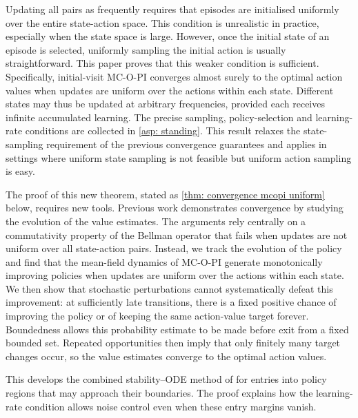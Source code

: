 Updating all pairs as frequently requires that episodes are initialised uniformly over the entire state-action space.
This condition is unrealistic in practice, especially when the state space is large.
However, once the initial state of an episode is selected, uniformly sampling the initial action is usually straightforward.
This paper proves that this weaker condition is sufficient.
Specifically, initial-visit MC-O-PI converges almost surely to the optimal action values when updates are uniform over the actions within each state.
Different states may thus be updated at arbitrary frequencies, provided each receives infinite accumulated learning. The precise sampling, policy-selection and learning-rate conditions are collected in \autoref{asp: standing}.
This result relaxes the state-sampling requirement of the previous convergence guarantees 
and applies in settings where uniform state sampling is not feasible but uniform action sampling is easy.






















The proof of this new theorem, stated as \autoref{thm: convergence mcopi uniform} below, requires new tools. 
Previous work demonstrates convergence by studying the evolution of the value estimates. The arguments rely centrally on a commutativity property of the Bellman operator that fails when updates are not uniform over all state-action pairs.
Instead, we track the evolution of the policy and find that the mean-field dynamics of MC-O-PI generate monotonically improving policies when updates are uniform over the actions within each state.
We then show that stochastic perturbations cannot systematically defeat this improvement: at sufficiently late transitions, there is a fixed positive chance of improving the policy or of keeping the same action-value target forever. Boundedness allows this probability estimate to be made before exit from a fixed bounded set. Repeated opportunities then imply that only finitely many target changes occur, so the value estimates converge to the optimal action values.

This develops the combined stability--ODE method of \citet[Section~5.4]{Kushner2003StochasticApplications} for entries into policy regions that may approach their boundaries. The proof explains how the learning-rate condition allows noise control even when these entry margins vanish.

